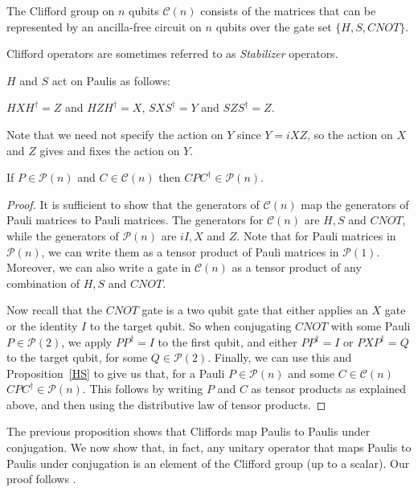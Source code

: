 \documentclass[12pt]{dalthesis}
\begin{document}
\begin{definition}
The Clifford group on $n$ qubits $\mathcal{C}(n)$ consists of the matrices that can be represented by an ancilla-free circuit on $n$ qubits over the gate set $\{H, S, CNOT\}$.
\end{definition}

Clifford operators are sometimes referred to as \emph{Stabilizer} operators.

\begin{proposition}
\label{HS}
$H$ and $S$ act on Paulis as follows:
\begin{center}
$HXH^{\dag} = Z$ and $HZH^{\dag} = X$, $SXS^{\dag} = Y$ and $SZS^{\dag} = Z$.
\end{center}
\end{proposition}

Note that we need not specify the action on $Y$ since $Y = iXZ$, so the action on $X$ and $Z$ gives and fixes the action on $Y$.

\begin{proposition}
\label{CliffordPtoP}
If $P \in \mathcal{P}(n)$ and $C \in \mathcal{C}(n)$ then $CPC^{\dag} \in \mathcal{P}(n)$.
\end{proposition}
\begin{proof}
It is sufficient to show that the generators of $\mathcal{C}(n)$ map the generators of Pauli matrices to Pauli matrices. The generators for $\mathcal{C}(n)$ are $H, S$ and $CNOT$, while the generators of $\mathcal{P}(n)$ are $iI, X$ and $Z$. Note that for Pauli matrices in $\mathcal{P}(n)$, we can write them as a tensor product of Pauli matrices in $\mathcal{P}(1)$. Moreover, we can also write a gate in $\mathcal{C}(n)$ as a tensor product of any combination of $H, S$ and $CNOT$. 

Now recall that the $CNOT$ gate is a two qubit gate that either applies an $X$ gate or the identity $I$ to the target qubit. So when conjugating $CNOT$ with some Pauli $P \in \mathcal{P}(2)$, we apply $PP^\dagger = I$ to the first qubit, and either $PP^\dagger = I$ or $PXP^\dagger = Q$ to the target qubit, for some $Q \in \mathcal{P}(2)$. Finally, we can use this and Proposition~\ref{HS} to give us that, for a Pauli $P \in \mathcal{P}(n)$ and some $C \in \mathcal{C}(n)$ $CPC^\dagger \in \mathcal{P}(n)$. This follows by writing $P$ and $C$ as tensor products as explained above, and then using the distributive law of tensor products.
\end{proof}

The previous proposition shows that Cliffords map Paulis to Paulis under conjugation. We now show that, in fact, any unitary operator that maps Paulis to Paulis under conjugation is an element of the Clifford group (up to a scalar). Our proof follows \cite{nielsen00}.
\end{document}
